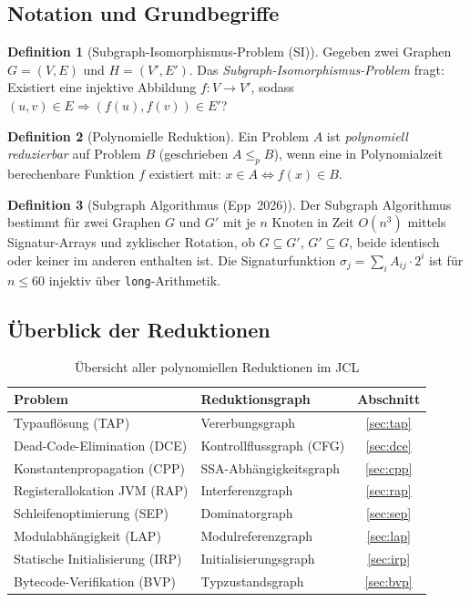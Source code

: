 ﻿\documentclass[a4paper,12pt]{article}
\theoremstyle{definition}
\newtheorem{definition}{Definition}
\begin{document}
\subsection{Notation und Grundbegriffe}

\begin{definition}[Subgraph-Isomorphismus-Problem (SI)]
\label{def:si}
Gegeben zwei Graphen $G = (V, E)$ und $H = (V', E')$.  Das
\emph{Subgraph-Isomorphismus-Problem} fragt: Existiert eine injektive
Abbildung $f\colon V \to V'$, sodass $(u, v) \in E \Rightarrow
(f(u), f(v)) \in E'$?
\end{definition}

\begin{definition}[Polynomielle Reduktion]
Ein Problem $A$ ist \emph{polynomiell reduzierbar} auf Problem $B$
(geschrieben $A \leq_p B$), wenn eine in Polynomialzeit berechenbare
Funktion $f$ existiert mit: $x \in A \Leftrightarrow f(x) \in B$.
\end{definition}

\begin{definition}[Subgraph Algorithmus (Epp~2026)]
\label{def:subgraph-algo}
Der Subgraph Algorithmus bestimmt f\"ur zwei Graphen $G$ und $G'$ mit
je $n$ Knoten in Zeit $O(n^3)$ mittels Signatur-Arrays und zyklischer
Rotation, ob $G \subseteq G'$, $G' \subseteq G$, beide identisch oder
keiner im anderen enthalten ist.  Die Signaturfunktion
$\sigma_j = \sum_{i} A_{ij}\cdot 2^i$ ist f\"ur $n \leq 60$ injektiv
\"uber \texttt{long}-Arithmetik.
\end{definition}

\subsection{\"Uberblick der Reduktionen}

\begin{table}[h!]
\centering
\renewcommand{\arraystretch}{1.4}
\begin{tabular}{|l|l|c|}
\hline
\textbf{Problem} & \textbf{Reduktionsgraph} & \textbf{Abschnitt} \\
\hline
Typaufl\"osung (TAP)               & Vererbungsgraph          & \ref{sec:tap} \\
Dead-Code-Elimination (DCE)        & Kontrollflussgraph (CFG) & \ref{sec:dce} \\
Konstantenpropagation (CPP)        & SSA-Abh\"angigkeitsgraph & \ref{sec:cpp} \\
Registerallokation JVM (RAP)       & Interferenzgraph         & \ref{sec:rap} \\
Schleifenoptimierung (SEP)         & Dominatorgraph           & \ref{sec:sep} \\
Modulabh\"angigkeit (LAP)          & Modulreferenzgraph       & \ref{sec:lap} \\
Statische Initialisierung (IRP)    & Initialisierungsgraph    & \ref{sec:irp} \\
Bytecode-Verifikation (BVP)        & Typzustandsgraph         & \ref{sec:bvp} \\
\hline
\end{tabular}
\caption{\"Ubersicht aller polynomiellen Reduktionen im JCL}
\label{tab:uebersicht}
\end{table}
\end{document}
